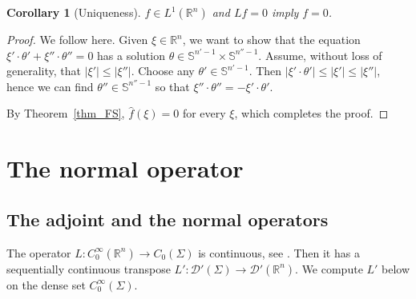 \documentclass[11pt]{amsart}
\newtheorem{corollary}[theorem]{Corollary}
\theoremstyle{definition}
\theoremstyle{remark}
\numberwithin{equation}{section}
\newcommand{\Rn}{\mathbb{R}^n}
\newcommand{\rb}{\mathbb{R}}
\renewcommand{\sb}{\mathbb{S}}
\begin{document}
\begin{corollary}[Uniqueness] \label{cor_uniq}
	$f\in L^1(\Rn)$ and $Lf=0$ imply $f=0$.
	\end{corollary}

\begin{proof} 
	We follow \cite{Ilmavirta-pseudo} here. 
Given $\xi\in\Rn$, we want to show that the equation $\xi'\cdot\theta' + \xi''\cdot\theta''=0$ has a solution  $\theta\in \sb^{n'-1}\times \sb^{n''-1}$. Assume, without loss of generality, that $|\xi'|\le |\xi''|$. Choose any $\theta'\in  \sb^{n'-1}$. Then $|\xi'\cdot\theta' |\le |\xi'| \le |\xi''|$, hence we can find $\theta''\in \sb^{n''-1}$ so that $ \xi''\cdot\theta''=- \xi'\cdot\theta'$.

By Theorem~\ref{thm_FS}, $\hat f(\xi)=0$ for every $\xi$, which completes the proof. 
\end{proof} 	

\section{The normal operator} \label{sec_3}
\subsection{The adjoint and the normal operators} The operator $L:C_0^\infty(\rb^n)\to C_0(\Sigma)$ is continuous, see \cite[sec.~2.8]{Friedlander1998}. Then it has a sequentially continuous transpose $L':\mathcal{D}'(\Sigma) \to \mathcal{D}'(\rb^n)$. We compute $L'$ below on the dense set $C_0^\infty(\Sigma)$. 
\end{document}
